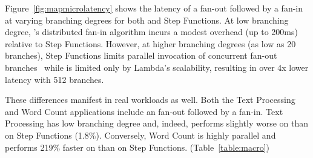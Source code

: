 Figure~\ref{fig:mapmicrolatency} shows the latency of a fan-out followed by a
fan-in at varying branching degrees for both \name{} and Step Functions. At low
branching degree, \name{}'s distributed fan-in algorithm incurs a modest
overhead (up to 200ms) relative to Step Functions. However, at higher branching
degrees (as low as 20 branches), Step Functions limits parallel invocation of
concurrent fan-out branches~\cite{aws-step-functions-map-state} while \name{} is
limited only by Lambda's scalability, resulting in over 4x lower latency with
512 branches.

These differences manifest in real workloads as well. Both the Text Processing
and Word Count applications include an fan-out followed by a fan-in. Text
Processing has low branching degree and, indeed, performs slightly worse on
\name{} than on Step Functions (1.8\%). Conversely, Word Count is highly
parallel and performs 219\% faster on \name{} than on Step Functions. (Table~\ref{table:macro})






